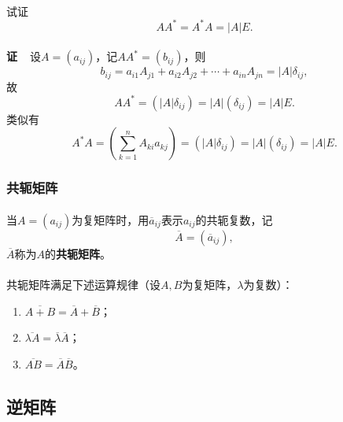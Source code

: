 \paragraph{}
试证
\begin{equation*}
  AA^* = A^*A = |A|E.
\end{equation*}

\paragraph{}
\textbf{证~~}设$A=(a_{ij})$，记$AA^*=(b_{ij})$，则
\begin{equation*}
  b_{ij} = a_{i1}A_{j1} + a_{i2}A_{j2} + \cdots + a_{in}A_{jn} = |A|\delta_{ij},
\end{equation*}
故
\begin{equation*}
  AA^* = (|A|\delta_{ij}) = |A|(\delta_{ij}) = |A|E.
\end{equation*}
类似有
\begin{equation*}
  A^*A = (\sum_{k=1}^nA_{ki}a_{kj}) = (|A|\delta_{ij}) = |A|(\delta_{ij}) = |A|E.
\end{equation*}

\subsubsection{共轭矩阵}
\paragraph{}
当$A=(a_{ij})$为复矩阵时，用$\overline{a}_{ij}$表示$a_{ij}$的共轭复数，记
\begin{equation*}
  \overline{A} = (\overline{a}_{ij}),
\end{equation*}
$\overline{A}$称为$A$的\textbf{共轭矩阵}。

\paragraph{}
共轭矩阵满足下述运算规律（设$A,B$为复矩阵，$\lambda$为复数）：
\begin{enumerate}
  \item $\overline{A+B}=\overline{A} + \overline{B}$；
  \item $\overline{\lambda A}=\overline{\lambda}\overline{A}$；
  \item $\overline{AB} = \overline{A}\overline{B}$。
\end{enumerate}

\subsection{逆矩阵}
